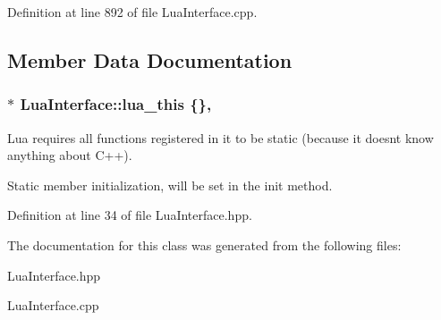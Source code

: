 Definition at line 892 of file Lua\+Interface.\+cpp.



\subsection{Member Data Documentation}
\subsubsection[{\texorpdfstring{lua\+\_\+this}{lua_this}}]{ $\ast$ Lua\+Interface\+::lua\+\_\+this \{\}\hspace{0.3cm}{\ttfamily [static]}, {\ttfamily [private]}}\hypertarget{class_lua_interface_a61b88a98c3d1d3f64161a674cf73a92e}{}\label{class_lua_interface_a61b88a98c3d1d3f64161a674cf73a92e}


Lua requires all functions registered in it to be static (because it doesn\textquotesingle{}t know anything about C++). 

Static member initialization, will be set in the init method. 

Definition at line 34 of file Lua\+Interface.\+hpp.



The documentation for this class was generated from the following files\+:\begin{DoxyCompactItemize}
\item 
Lua\+Interface.\+hpp\item 
Lua\+Interface.\+cpp\end{DoxyCompactItemize}
